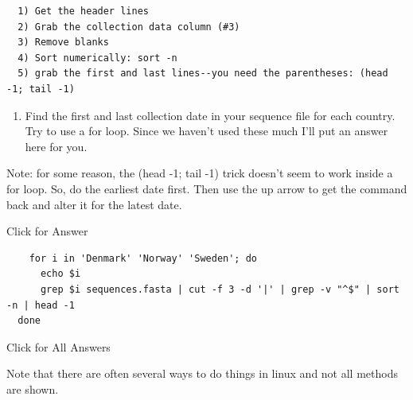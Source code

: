 \documentclass[
]{book}
\providecommand{\tightlist}{%
  \setlength{\itemsep}{0pt}\setlength{\parskip}{0pt}}
\begin{document}
\begin{verbatim}
  1) Get the header lines
  2) Grab the collection data column (#3)
  3) Remove blanks
  4) Sort numerically: sort -n
  5) grab the first and last lines--you need the parentheses: (head -1; tail -1)
\end{verbatim}

\begin{enumerate}
\def\labelenumi{\arabic{enumi}.}
\setcounter{enumi}{9}
\tightlist
\item
  Find the first and last collection date in your sequence file for each country. Try to use a for loop. Since we haven't used these much I'll put an answer here for you.
\end{enumerate}

Note: for some reason, the (head -1; tail -1) trick doesn't seem to work inside a for loop. So, do the earliest date first. Then use the up arrow to get the command back and alter it for the latest date.

Click for Answer

\begin{verbatim}
    for i in 'Denmark' 'Norway' 'Sweden'; do
      echo $i
      grep $i sequences.fasta | cut -f 3 -d '|' | grep -v "^$" | sort -n | head -1
  done
\end{verbatim}

\hfill\break

Click for All Answers

Note that there are often several ways to do things in linux and not all methods are shown.
\end{document}
